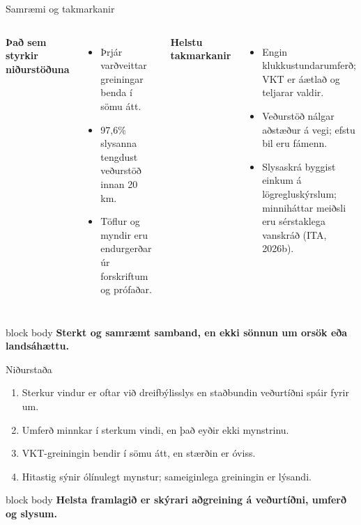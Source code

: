 \documentclass[aspectratio=169,11pt]{beamer}
\newcommand{\takeaway}[1]{%
  \begin{beamercolorbox}[rounded=true,sep=0.75em,wd=0.94\linewidth]{block body}
    \centering\color{navy}\bfseries #1
  \end{beamercolorbox}}
\begin{document}
\begin{frame}{Samræmi og takmarkanir}
\begin{columns}[T,onlytextwidth]
  {\color{blue}\large\bfseries Það sem styrkir niðurstöðuna}
  \begin{itemize}\setlength\itemsep{0.8em}
    \item Þrjár varðveittar greiningar benda í sömu átt.
    \item 97,6\% slysanna tengdust veðurstöð innan 20 km.
    \item Töflur og myndir eru endurgerðar úr forskriftum og prófaðar.
  \end{itemize}
  {\color{orange}\large\bfseries Helstu takmarkanir}
  \begin{itemize}\setlength\itemsep{0.8em}
    \item Engin klukkustundarumferð; VKT er áætlað og teljarar valdir.
    \item Veðurstöð nálgar aðstæður á vegi; efstu bil eru fámenn.
    \item Slysaskrá byggist einkum á lögregluskýrslum; minniháttar meiðsli eru sérstaklega vanskráð (ITA, 2026b).
  \end{itemize}
\end{columns}
\vfill
\takeaway{Sterkt og samræmt samband, en ekki sönnun um orsök eða landsáhættu.}
\end{frame}

\begin{frame}{Niðurstaða}
\begin{enumerate}\setlength\itemsep{0.75em}
  \item Sterkur vindur er oftar við dreifbýlisslys en staðbundin veðurtíðni spáir fyrir um.
  \item Umferð minnkar í sterkum vindi, en það eyðir ekki mynstrinu.
  \item VKT-greiningin bendir í sömu átt, en stærðin er óviss.
  \item Hitastig sýnir ólínulegt mynstur; sameiginlega greiningin er lýsandi.
\end{enumerate}
\vfill
\takeaway{Helsta framlagið er skýrari aðgreining á veðurtíðni, umferð og slysum.}
\end{frame}

\appendix
\end{document}
